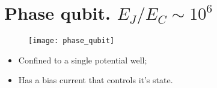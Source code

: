 \newpage\section{Phase qubit. $ E_J/E_C \sim 10^6 $}

\begin{figure}[h]
  \centering \texttt{[image: phase\_qubit]}
\end{figure}

\noindent

\begin{itemize}
\item Confined to a single potential well;
\item Has a bias current that controls it's state.
\end{itemize}

\newpage
